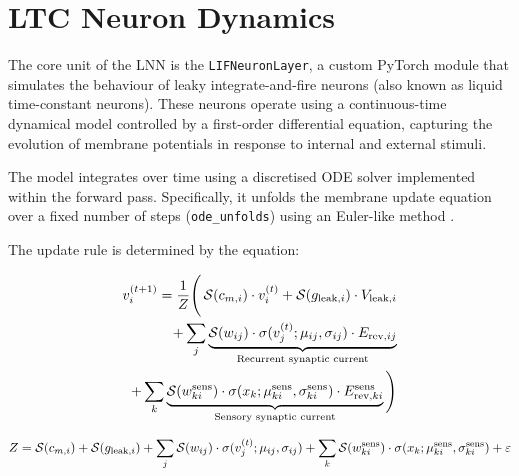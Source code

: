 \section{LTC Neuron Dynamics}
The core unit of the LNN is the \texttt{LIFNeuronLayer}, a custom PyTorch module that simulates the behaviour of leaky integrate-and-fire neurons (also known as liquid time-constant neurons). These neurons operate using a continuous-time dynamical model controlled by a first-order differential equation, capturing the evolution of membrane potentials in response to internal and external stimuli.

The model integrates over time using a discretised ODE solver implemented within the forward pass. Specifically, it unfolds the membrane update equation over a fixed number of steps (\texttt{ode\_unfolds}) using an Euler-like method \cite{hasaniLiquidTimeconstantNetworks2021}.

\noindent The update rule is determined by the equation:

\begin{equation}
    \begin{aligned}
    v_i^{(t+1)} = \frac{1}{Z} \Bigg( 
    \operatorname{\mathcal{S}}(c_{m,i}) \cdot v_i^{(t)} + 
    \operatorname{\mathcal{S}}(g_{\text{leak},i}) \cdot V_{\text{leak},i} \\
    + \sum_j \underbrace{ \operatorname{\mathcal{S}}(w_{ij}) \cdot \sigma(v_j^{(t)}; \mu_{ij}, \sigma_{ij}) \cdot E_{\text{rev},ij} }_{\text{Recurrent synaptic current}} \\
    + \sum_k \underbrace{ \operatorname{\mathcal{S}}(w^{\text{sens}}_{ki}) \cdot \sigma(x_k; \mu^{\text{sens}}_{ki}, \sigma^{\text{sens}}_{ki}) \cdot E^{\text{sens}}_{\text{rev},ki} }_{\text{Sensory synaptic current}} 
    \Bigg)
    \end{aligned}
    \label{eq:v_update}
\end{equation}

\begin{equation}
Z = 
\operatorname{\mathcal{S}}(c_{m,i}) + 
\operatorname{\mathcal{S}}(g_{\text{leak},i}) +
\sum_j \operatorname{\mathcal{S}}(w_{ij}) \cdot \sigma(v_j^{(t)}; \mu_{ij}, \sigma_{ij}) +
\sum_k \operatorname{\mathcal{S}}(w^{\text{sens}}_{ki}) \cdot \sigma(x_k; \mu^{\text{sens}}_{ki}, \sigma^{\text{sens}}_{ki}) + \varepsilon
\label{eq:v_update_denominator}
\end{equation}

